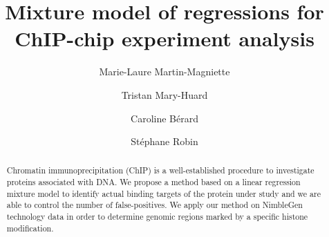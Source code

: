 \documentclass{llncs}
\begin{document}
\frontmatter          %
\pagestyle{headings}  %

\title{Mixture model of regressions for ChIP-chip experiment analysis}
 \author{Marie-Laure
  Martin-Magniette\and Tristan Mary-Huard \and
  Caroline B\'erard \and St\'ephane Robin}


\maketitle              %

\begin{abstract}
  Chromatin immunoprecipitation (ChIP) is a well-established procedure
  to investigate proteins associated with DNA. We propose a
  method based on a linear regression mixture model to identify
  actual binding targets of the protein under study and we are able to
  control the number of false-positives. We apply our method
  on NimbleGen technology data in order to determine genomic regions
  marked by a specific histone modification.
\end{abstract}
\end{document}
